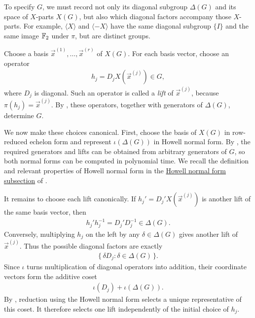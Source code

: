 To specify $G$, we must record not only its diagonal subgroup $\Delta(G)$ and its space of $X$-parts $X(G)$, but also which diagonal factors accompany those $X$-parts.
For example, $\langle X\rangle$ and $\langle -X\rangle$ have the same diagonal subgroup $\{I\}$ and the same image $\mathbb{F}_2$ under $\pi$, but are distinct groups.

Choose a basis $\vec{x}^{(1)},\ldots,\vec{x}^{(r)}$ of $X(G)$.
For each basis vector, choose an operator
\begin{align}
    h_j=D_jX(\vec{x}^{(j)})\in G,
\end{align}
where $D_j$ is diagonal.
Such an operator is called a \emph{lift} of $\vec{x}^{(j)}$, because $\pi(h_j)=\vec{x}^{(j)}$.
By , these operators, together with generators of $\Delta(G)$, determine $G$.

We now make these choices canonical.
First, choose the basis of $X(G)$ in row-reduced echelon form and represent $\iota(\Delta(G))$ in Howell normal form.
By , the required generators and lifts can be obtained from arbitrary generators of $G$, so both normal forms can be computed in polynomial time.
We recall the definition and relevant properties of Howell normal form in the \hyperref[app:howell]{Howell normal form subsection} of .

It remains to choose each lift canonically.
If $h_j'=D_j'X(\vec{x}^{(j)})$ is another lift of the same basis vector, then
\begin{align}
    h_j'h_j^{-1}=D_j'D_j^{-1}\in\Delta(G).
\end{align}
Conversely, multiplying $h_j$ on the left by any $\delta\in\Delta(G)$ gives another lift of $\vec{x}^{(j)}$.
Thus the possible diagonal factors are exactly
\begin{align}
    \{\,\delta D_j:\delta\in\Delta(G)\,\}.
\end{align}
Since $\iota$ turns multiplication of diagonal operators into addition, their coordinate vectors form the additive coset
\begin{align}
    \iota(D_j)+\iota(\Delta(G)).
\end{align}
By , reduction using the Howell normal form selects a unique representative of this coset.
It therefore selects one lift independently of the initial choice of $h_j$.

